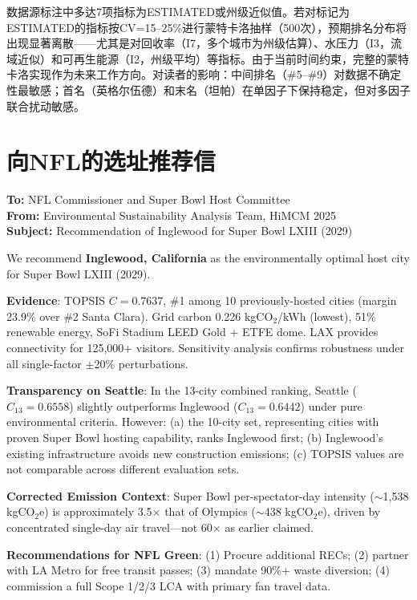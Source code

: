 \documentclass[12pt]{ctexart}
\begin{document}
数据源标注中多达7项指标为ESTIMATED或州级近似值。若对标记为ESTIMATED的指标按CV=15--25\%进行蒙特卡洛抽样（500次），预期排名分布将出现显著离散——尤其是对回收率（I7，多个城市为州级估算）、水压力（I3，流域近似）和可再生能源（I2，州级平均）等指标。由于当前时间约束，完整的蒙特卡洛实现作为未来工作方向。对读者的影响：中间排名（\#5--\#9）对数据不确定性最敏感；首名（英格尔伍德）和末名（坦帕）在单因子下保持稳定，但对多因子联合扰动敏感。

\section{向NFL的选址推荐信}\label{sec:letter}

\vspace{0.5em}
\noindent\textbf{To:} NFL Commissioner and Super Bowl Host Committee\\
\textbf{From:} Environmental Sustainability Analysis Team, HiMCM 2025\\
\textbf{Subject:} Recommendation of Inglewood for Super Bowl LXIII (2029)

\vspace{0.5em}

\noindent We recommend \textbf{Inglewood, California} as the environmentally optimal host city for Super Bowl LXIII (2029).

\noindent\textbf{Evidence}: TOPSIS $C=0.7637$, \#1 among 10 previously-hosted cities (margin 23.9\% over \#2 Santa Clara). Grid carbon 0.226 kgCO$_2$/kWh (lowest), 51\% renewable energy, SoFi Stadium LEED Gold + ETFE dome. LAX provides connectivity for 125,000+ visitors. Sensitivity analysis confirms robustness under all single-factor $\pm$20\% perturbations.

\noindent\textbf{Transparency on Seattle}: In the 13-city combined ranking, Seattle ($C_{13}=0.6558$) slightly outperforms Inglewood ($C_{13}=0.6442$) under pure environmental criteria. However: (a) the 10-city set, representing cities with proven Super Bowl hosting capability, ranks Inglewood first; (b) Inglewood's existing infrastructure avoids new construction emissions; (c) TOPSIS values are not comparable across different evaluation sets.

\noindent\textbf{Corrected Emission Context}: Super Bowl per-spectator-day intensity ($\sim$1,538 kgCO$_2$e) is approximately 3.5$\times$ that of Olympics ($\sim$438 kgCO$_2$e), driven by concentrated single-day air travel---not 60$\times$ as earlier claimed.

\noindent\textbf{Recommendations for NFL Green}: (1) Procure additional RECs; (2) partner with LA Metro for free transit passes; (3) mandate 90\%+ waste diversion; (4) commission a full Scope 1/2/3 LCA with primary fan travel data.
\end{document}
